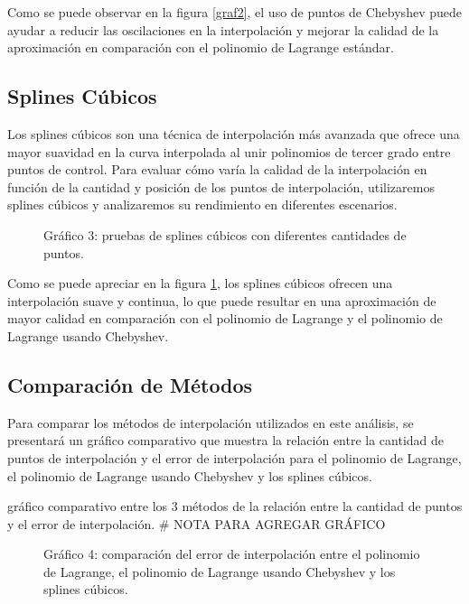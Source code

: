 \documentclass[12pt,a4]{article} %
\begin{document}
\begin{multicols}{2}
Como se puede observar en la figura \ref{graf2}, el uso de puntos de Chebyshev puede ayudar a reducir las oscilaciones en la interpolación y mejorar la calidad de la aproximación en comparación con el polinomio de Lagrange estándar.

\subsection{Splines Cúbicos}

Los splines cúbicos son una técnica de interpolación más avanzada que ofrece una mayor suavidad en la curva interpolada al unir polinomios de tercer grado entre puntos de control. Para evaluar cómo varía la calidad de la interpolación en función de la cantidad y posición de los puntos de interpolación, utilizaremos splines cúbicos y analizaremos su rendimiento en diferentes escenarios.

\begin{figure}
    \centering
    \caption{Gráfico 3: pruebas de splines cúbicos con diferentes cantidades de puntos.}
    \label{graf3}
\end{figure}

Como se puede apreciar en la figura \ref{graf3}, los splines cúbicos ofrecen una interpolación suave y continua, lo que puede resultar en una aproximación de mayor calidad en comparación con el polinomio de Lagrange y el polinomio de Lagrange usando Chebyshev.

\subsection{Comparación de Métodos}

Para comparar los métodos de interpolación utilizados en este análisis, se presentará un gráfico comparativo que muestra la relación entre la cantidad de puntos de interpolación y el error de interpolación para el polinomio de Lagrange, el polinomio de Lagrange usando Chebyshev y los splines cúbicos.

gráfico comparativo entre los 3 métodos de la relación entre la cantidad de puntos y el error de interpolación. # NOTA PARA AGREGAR GRÁFICO

\begin{figure}
    \centering
    \caption{Gráfico 4: comparación del error de interpolación entre el polinomio de Lagrange, el polinomio de Lagrange usando Chebyshev y los splines cúbicos.}
    \label{graf4}
\end{figure}


\end{multicols}
\end{document}
